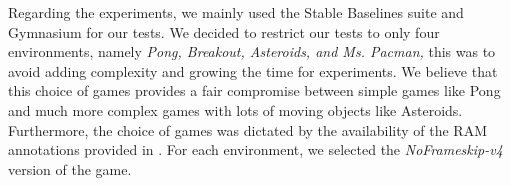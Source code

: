 




Regarding the experiments, we mainly used the Stable Baselines suite \cite{stable-baselines} and Gymnasium \cite{towers_gymnasium_2023} for our tests.
We decided to restrict our tests to only four environments, namely \textit{Pong, Breakout, Asteroids, and Ms. Pacman,} this was to avoid adding complexity and growing the time for experiments. We believe that this choice of games provides a fair compromise between simple games like Pong and much more complex games with lots of moving objects like Asteroids.
Furthermore, the choice of games was dictated by the availability of the RAM annotations provided in \cite{anand2019unsupervised}.
For each environment, we selected the \textit{NoFrameskip-v4} version of the game.

